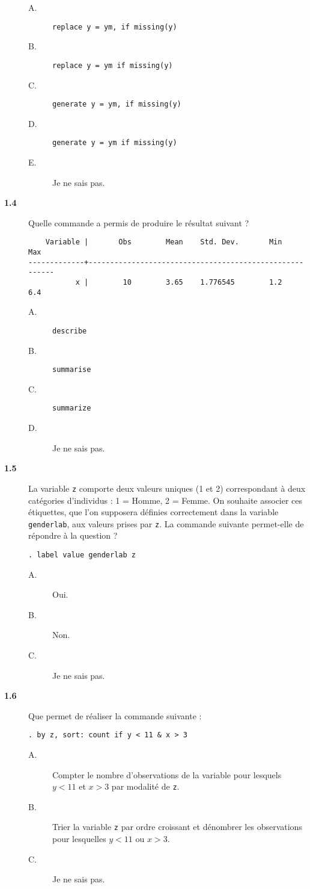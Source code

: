 \begin{description}
\begin{description}
  \item[A.] \verb|replace y = ym, if missing(y)|
  \item[B.] \verb|replace y = ym if missing(y)|
  \item[C.] \verb|generate y = ym, if missing(y)|
  \item[D.] \verb|generate y = ym if missing(y)|
  \item[E.] Je ne sais pas.
  \end{description}  
\item[\bf 1.4] Quelle commande a permis de produire le résultat suivant ?
\begin{verbatim}
    Variable |       Obs        Mean    Std. Dev.       Min        Max
-------------+--------------------------------------------------------
           x |        10        3.65    1.776545        1.2        6.4
\end{verbatim}
  \begin{description}
  \item[A.] \verb|describe|
  \item[B.] \verb|summarise|
  \item[C.] \verb|summarize| 
  \item[D.] Je ne sais pas.
  \end{description}
\item[\bf 1.5] La variable \texttt{z} comporte deux valeurs uniques (1 et 2)
  correspondant à deux catégories d'individus : 1 = Homme, 2 = Femme. On
  souhaite associer ces étiquettes, que l'on supposera définies correctement
  dans la variable \texttt{genderlab}, aux valeurs prises par \texttt{z}. La
  commande suivante permet-elle de répondre à la question ? 
\begin{verbatim}
. label value genderlab z
\end{verbatim}
  \begin{description}
  \item[A.] Oui.
  \item[B.] Non.
  \item[C.] Je ne sais pas.
  \end{description}  
\item[\bf 1.6] Que permet de réaliser la commande suivante : 
\begin{verbatim}
. by z, sort: count if y < 11 & x > 3
\end{verbatim}
  \begin{description}
  \item[A.] Compter le nombre d'observations de la variable pour lesquels $y
    < 11$ et $x > 3$ par modalité de \texttt{z}.
  \item[B.] Trier la variable \texttt{z} par ordre croissant et dénombrer
    les observations pour lesquelles $y < 11$ ou $x > 3$.
  \item[C.] Je ne sais pas.
  \end{description}  

\end{description}
